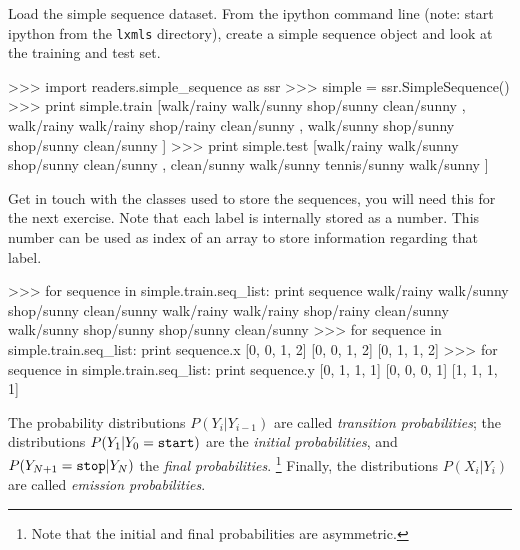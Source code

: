 \begin{exercise}
Load the simple sequence dataset. 
From the ipython command line (note: start ipython from the {\tt lxmls}
directory), create a simple sequence object and look at the training
and test set.
\begin{python}
>>> import readers.simple_sequence as ssr
>>> simple = ssr.SimpleSequence()
>>> print simple.train
[walk/rainy walk/sunny shop/sunny clean/sunny , walk/rainy walk/rainy shop/rainy clean/sunny , walk/sunny shop/sunny shop/sunny clean/sunny ]
>>> print simple.test
[walk/rainy walk/sunny shop/sunny clean/sunny , clean/sunny walk/sunny tennis/sunny walk/sunny ]
\end{python}
Get in touch with the classes used to store the sequences, you will need this for the next exercise. Note that each label is internally stored as a number. This number can be used as index of an array to store information regarding that label.
\begin{python}
>>> for sequence in simple.train.seq_list:
	print sequence
walk/rainy walk/sunny shop/sunny clean/sunny
walk/rainy walk/rainy shop/rainy clean/sunny
walk/sunny shop/sunny shop/sunny clean/sunny
>>> for sequence in simple.train.seq_list:
	print sequence.x
[0, 0, 1, 2]
[0, 0, 1, 2]
[0, 1, 1, 2]
>>> for sequence in simple.train.seq_list:
	print sequence.y
[0, 1, 1, 1]
[0, 0, 0, 1]
[1, 1, 1, 1]
\end{python}

\end{exercise}

The probability distributions $P(Y_{i}|Y_{i-1})$ are called \emph{transition probabilities}; the distributions 
$P(Y_{1}|Y_{0} = {\tt start})$ are the \emph{initial probabilities}, and 
$P(Y_{N+1}={\tt stop} |Y_{N})$ the \emph{final probabilities}.%
\footnote{Note that the initial and final probabilities 
are asymmetric.} %
Finally, the distributions $P(X_i|Y_i)$ are called \emph{emission probabilities}. 



